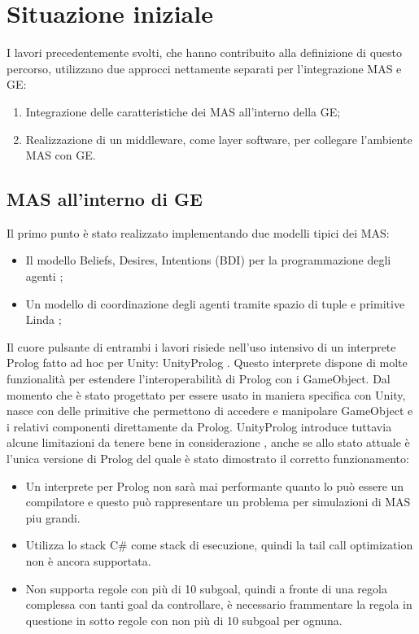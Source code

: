 \section{Situazione iniziale}

I lavori precedentemente svolti, che hanno contribuito alla definizione di questo percorso, utilizzano due approcci nettamente separati per l'integrazione MAS e GE:
\begin{enumerate}
	\item Integrazione delle caratteristiche dei MAS all'interno della GE;
	\item Realizzazione di un middleware, come layer software, per collegare l'ambiente MAS con GE.
\end{enumerate}

\subsection{MAS all'interno di GE} \label{MAS_dentro_GE}

Il primo punto è stato realizzato implementando due modelli tipici dei MAS:
\begin{itemize}
	\item Il modello Beliefs, Desires, Intentions (BDI) per la programmazione degli agenti \cite{amslaurea15657};
	\item Un modello di coordinazione degli agenti tramite spazio di tuple e primitive Linda \cite{amslaurea8424}\cite{amslaurea16100};
\end{itemize}

Il cuore pulsante di entrambi i lavori risiede nell'uso intensivo di un interprete Prolog fatto ad hoc per Unity: UnityProlog \cite{unity_prolog}. Questo interprete dispone di molte funzionalità per estendere l'interoperabilità di Prolog con i GameObject.
Dal momento che è stato progettato per essere usato in maniera specifica con Unity, nasce con delle primitive che permettono di accedere e manipolare GameObject e i relativi componenti direttamente da Prolog. UnityProlog introduce tuttavia alcune limitazioni da tenere bene in considerazione \cite{amslaurea15657}, anche se allo stato attuale è l'unica versione di Prolog del quale è stato dimostrato il corretto funzionamento:
\begin{itemize}
	\item Un interprete per Prolog non sarà mai performante quanto lo può essere un compilatore e questo può rappresentare un problema per simulazioni di MAS piu grandi.
	\item Utilizza lo stack C\# come stack di esecuzione, quindi la tail call optimization non è ancora supportata.
	\item Non supporta regole con più di 10 subgoal, quindi a fronte di una regola complessa con tanti goal da controllare, è necessario frammentare la regola in questione in sotto regole con non più di 10 subgoal per ognuna.
\end{itemize}

